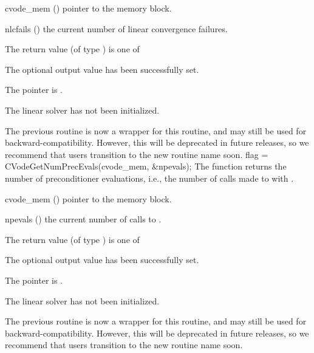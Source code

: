 {
  \begin{args}
  \item[cvode\_mem] ()
    pointer to the {\cvodes} memory block.
  \item[nlcfails] ()
    the current number of linear convergence failures.
  \end{args}
}
{
  The return value  (of type ) is one of
  \begin{args}
  \item[\Id{CVLS\_SUCCESS}]
    The optional output value has been successfully set.
  \item[\Id{CVLS\_MEM\_NULL}]
    The  pointer is .
  \item[\Id{CVLS\_LMEM\_NULL}]
    The {\cvls} linear solver has not been initialized.
  \end{args}
}
{
  The previous routine  is now a wrapper for
  this routine, and may still be used for backward-compatibility.
  However, this will be deprecated in future releases, so we recommend
  that users transition to the new routine name soon.
}
{
  flag = CVodeGetNumPrecEvals(cvode\_mem, \&npevals);
}
{
  The function  returns the
  number of preconditioner evaluations, i.e., the number of
  calls made to  with .
}
{
  \begin{args}
  \item[cvode\_mem] ()
    pointer to the {\cvodes} memory block.
  \item[npevals] ()
    the current number of calls to .
  \end{args}
}
{
  The return value  (of type ) is one of
  \begin{args}
  \item[\Id{CVLS\_SUCCESS}]
    The optional output value has been successfully set.
  \item[\Id{CVLS\_MEM\_NULL}]
    The  pointer is .
  \item[\Id{CVLS\_LMEM\_NULL}]
    The {\cvls} linear solver has not been initialized.
  \end{args}
}
{
  The previous routine  is now a wrapper for
  this routine, and may still be used for backward-compatibility.
  However, this will be deprecated in future releases, so we recommend
  that users transition to the new routine name soon.
}
